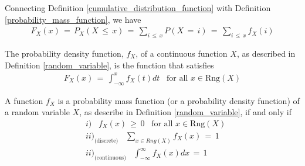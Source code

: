 \begin{note}
Connecting Definition \ref{cumulative_distribution_function} with Definition \ref{probability_mass_function}, we have
\begin{align*}
    F_{X}(x) \hspace{2pt} = \hspace{2pt} P_{X}(X \hspace{2pt} \leq \hspace{2pt} x) \hspace{2pt} = \hspace{2pt} \sum_{i \hspace{2pt} \leq \hspace{2pt} x} P(X \hspace{2pt} = \hspace{2pt} i) \hspace{2pt} = \hspace{2pt} \sum_{i \hspace{2pt} \leq \hspace{2pt} x} f_{X}(i)
\end{align*}
\end{note}

\begin{definition}
The probability density function, $f_{X}$, of a continuous function $X$, as described in Definition \ref{random_variable}, is the function that satisfies 
\begin{align*}
    F_{X}(x) \hspace{2pt} = \hspace{2pt} \int_{-\infty}^{x} f_{X}(t) dt \hspace{10pt} \text{for all} \hspace{4pt} x \in \text{Rng}(X)
\end{align*}
\end{definition}

\begin{theorem}
A function $f_{X}$ is a probability mass function (or a probability density function) of a random variable $X$, as describe in Definition \ref{random_variable}, if and only if
\begin{align*}
    &i) \hspace{10pt} f_{X}(x) \hspace{2pt} \geq \hspace{2pt} 0 \hspace{10pt} \text{for all} \hspace{4pt} x \in \text{Rng}(X)\\[2ex]
    &ii)_\text{(discrete)} \hspace{10pt} \sum_{x \in Rng(X)} f_{X}(x) \hspace{2pt} = \hspace{2pt} 1\\[2ex]
    &ii)_\text{(continuous)} \hspace{10pt} \int_{-\infty}^{\infty} f_{X}(x) dx \hspace{2pt} = \hspace{2pt} 1
\end{align*}
\end{theorem}

